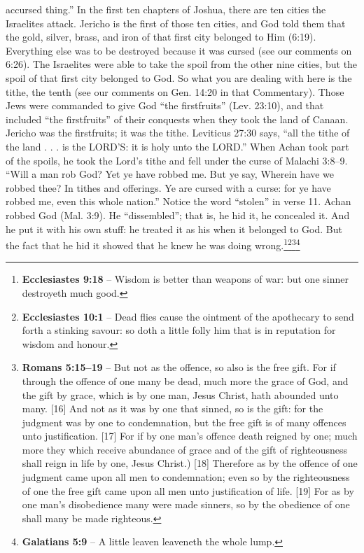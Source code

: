 {{accursed thing.” In the first ten chapters of
Joshua, there are ten cities the Israelites attack.
Jericho is the first of those ten cities, and God
told them that the gold, silver, brass, and iron of
that first city belonged to Him (6:19).
Everything else was to be destroyed because it
was cursed (see our comments on 6:26). The
Israelites were able to take the spoil from the
other nine cities, but the spoil of that first city
belonged to God. So what you are dealing with
here is the tithe, the tenth (see our comments on
Gen. 14:20 in that Commentary). Those Jews
were commanded to give God “the firstfruits”
(Lev. 23:10), and that included “the
firstfruits” of their conquests when they took
the land of Canaan. Jericho was the firstfruits;
it was the tithe.
Leviticus 27:30 says, “all the tithe of the
land . . . is the LORD’S: it is holy unto the
LORD.” When Achan took part of the spoils,
he took the Lord’s tithe and fell under the curse
of Malachi 3:8–9.
“Will a man rob God? Yet ye have
robbed me. But ye say, Wherein have we
robbed thee? In tithes and offerings. Ye are
cursed with a curse: for ye have robbed me,
even this whole nation.”
Notice the word “stolen” in verse 11.
Achan robbed God (Mal. 3:9). He
“dissembled”; that is, he hid it, he concealed
it. And he put it with his own stuff: he treated it
as his when it belonged to God. But the fact
that he hid it showed that he knew he was doing
wrong.}\footnote{\textbf{Ecclesiastes 9:18} -- Wisdom is better than weapons of war: but one sinner destroyeth much good.}\footnote{\textbf{Ecclesiastes 10:1} -- Dead flies cause the ointment of the apothecary to send forth a stinking savour: so doth a little folly him that is in reputation for wisdom and honour.}\footnote{\textbf{Romans 5:15--19} -- But not as the offence, so also is the free gift. For if through the offence of one many be dead, much more the grace of God, and the gift by grace, which is by one man, Jesus Christ, hath abounded unto many. [16] And not as it was by one that sinned, so is the gift: for the judgment was by one to condemnation, but the free gift is of many offences unto justification. 
[17]  For if by one man's offence death reigned by one; much more they which receive abundance of grace and of the gift of righteousness shall reign in life by one, Jesus Christ.) [18] Therefore as by the offence of one judgment came upon all men to condemnation; even so by the righteousness of one the free gift came upon all men unto justification of life. [19]  For as by one man's disobedience many were made sinners, so by the obedience of one shall many be made righteous. }\footnote{\textbf{Galatians 5:9} -- A little leaven leaveneth the whole lump.}
}
